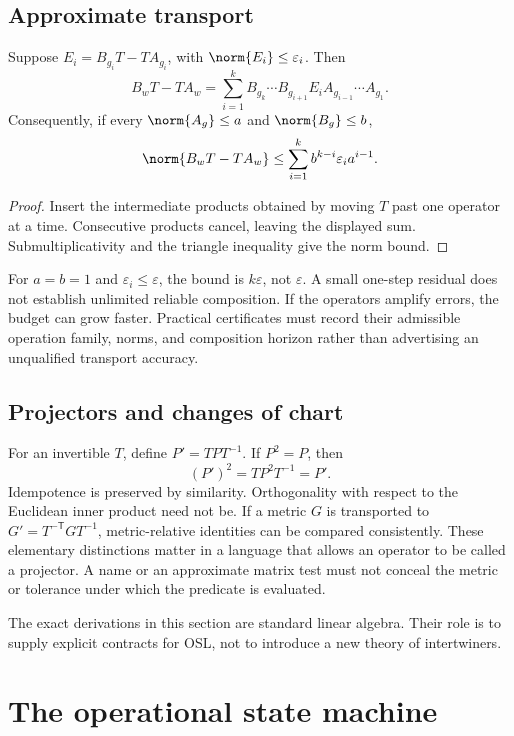 \documentclass[11pt]{article}
\begin{document}
\subsection{Approximate transport}
\begin{proposition}\label{prop:approx}
Suppose \(E_i=B_{g_i}T-TA_{g_i}\), with \(\norm{E_i}\le\varepsilon_i\). Then
\[
 B_wT-TA_w=\sum_{i=1}^{k}B_{g_k}\cdots B_{g_{i+1}}E_iA_{g_{i-1}}\cdots A_{g_1}.
\]
Consequently, if every \(\norm{A_g}\le a\) and \(\norm{B_g}\le b\),
\[
 \norm{B_wT-TA_w}\le\sum_{i=1}^{k} b^{k-i}\varepsilon_i a^{i-1}.
\]
\end{proposition}
\begin{proof}
Insert the intermediate products obtained by moving \(T\) past one operator at a time. Consecutive products cancel, leaving the displayed sum. Submultiplicativity and the triangle inequality give the norm bound.
\end{proof}
For \(a=b=1\) and \(\varepsilon_i\le\varepsilon\), the bound is \(k\varepsilon\), not \(\varepsilon\). A small one-step residual does not establish unlimited reliable composition. If the operators amplify errors, the budget can grow faster. Practical certificates must record their admissible operation family, norms, and composition horizon rather than advertising an unqualified transport accuracy.

\subsection{Projectors and changes of chart}
For an invertible \(T\), define \(P'=TPT^{-1}\). If \(P^2=P\), then
\[
 (P')^2=TP^2T^{-1}=P'.
\]
Idempotence is preserved by similarity. Orthogonality with respect to the Euclidean inner product need not be. If a metric \(G\) is transported to \(G'=T^{-\mathsf T}GT^{-1}\), metric-relative identities can be compared consistently. These elementary distinctions matter in a language that allows an operator to be called a projector. A name or an approximate matrix test must not conceal the metric or tolerance under which the predicate is evaluated.

The exact derivations in this section are standard linear algebra. Their role is to supply explicit contracts for OSL, not to introduce a new theory of intertwiners.

\section{The operational state machine}
\end{document}
